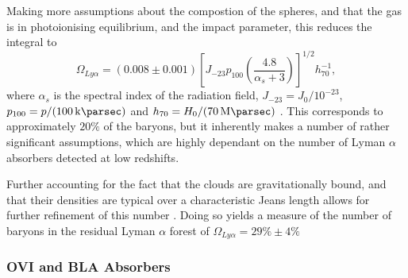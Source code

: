 \par Making more assumptions about the compostion of the spheres, and that the gas is in photoionising equilibrium, and the impact parameter, this reduces the integral to
$$\Omega_{Ly\alpha} = (0.008 \pm 0.001) \left[ J_{-23} p_{100} \left(\frac{ 4.8}{ \alpha_s + 3} \right) \right]^{1/2} h_{70}^{-1}, $$
where $\alpha_s$ is the spectral index of the radiation field, $J_{-23}= J_0/10^{-23}$, $p_{100} = p/(\SI{100}{\kilo\parsec})$ and $h_{70} = H_0/(\SI{70}{\mega\parsec})$ . This corresponds to approximately $20\%$ of the baryons, but it inherently makes a number of rather significant assumptions, which are highly dependant on the number of Lyman $\alpha$ absorbers detected at low redshifts. 
\par Further accounting for the fact that the clouds are gravitationally bound, and that their densities are typical over a characteristic Jeans length allows for further refinement of this number \citep{2001ApJ...559..507S}. Doing so yields a measure of the number of baryons in the residual Lyman $\alpha$ forest of $\Omega_{Ly\alpha} = 29 \% \pm 4\%$ \citep{ 2004ApJS..152...29P,2008ApJ...679..194D}  
\subsubsection{OVI and BLA Absorbers}

